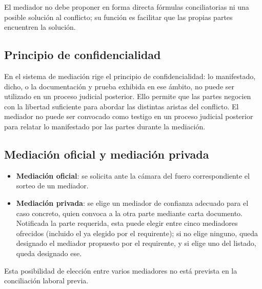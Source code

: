 \documentclass[12pt,oneside]{book}
\begin{document}
\begin{important}
El mediador no debe proponer en forma directa fórmulas conciliatorias ni una posible solución al conflicto; su función es facilitar que las propias partes encuentren la solución.
\end{important}

\subsection{Principio de confidencialidad}

En el sistema de mediación rige el principio de confidencialidad: lo manifestado, dicho, o la documentación y prueba exhibida en ese ámbito, no puede ser utilizado en un proceso judicial posterior. Ello permite que las partes negocien con la libertad suficiente para abordar las distintas aristas del conflicto. El mediador no puede ser convocado como testigo en un proceso judicial posterior para relatar lo manifestado por las partes durante la mediación.

\subsection{Mediación oficial y mediación privada}

\begin{itemize}
    \item \textbf{Mediación oficial}: se solicita ante la cámara del fuero correspondiente el sorteo de un mediador.
    \item \textbf{Mediación privada}: se elige un mediador de confianza adecuado para el caso concreto, quien convoca a la otra parte mediante carta documento. Notificada la parte requerida, esta puede elegir entre cinco mediadores ofrecidos (incluido el ya elegido por el requirente); si no elige ninguno, queda designado el mediador propuesto por el requirente, y si elige uno del listado, queda designado ese.
\end{itemize}


\begin{note}
Esta posibilidad de elección entre varios mediadores no está prevista en la conciliación laboral previa.
\end{note}
\end{document}
